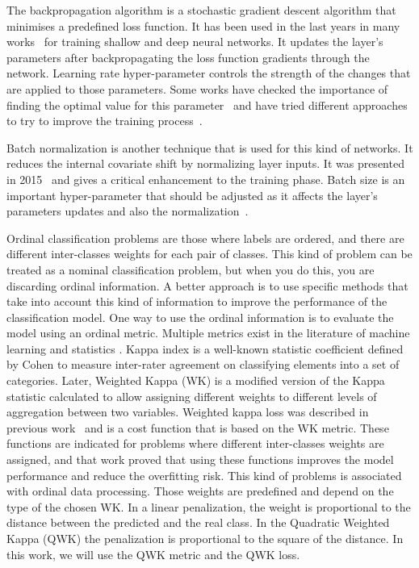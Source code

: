 \documentclass[journal]{IEEEtran}
\begin{document}
	The backpropagation algorithm is a stochastic gradient descent algorithm that minimises a predefined loss function. It has been used in the last years in many works~\cite{leonard1990improvement,yu1995dynamic,krizhevsky2012imagenet,de2018weighted} for training shallow and deep neural networks. It updates the layer's parameters after backpropagating the loss function gradients through the network. Learning rate hyper-parameter controls the strength of the changes that are applied to those parameters. Some works have checked the importance of finding the optimal value for this parameter~\cite{senior2013empirical} and have tried different approaches to try to improve the training process~\cite{smith2017cyclical}.
	
	Batch normalization is another technique that is used for this kind of networks. It reduces the internal covariate shift by normalizing layer inputs. It was presented in 2015~\cite{ioffe2015batch} and gives a critical enhancement to the training phase. Batch size is an important hyper-parameter that should be adjusted as it affects the layer's parameters updates and also the normalization~\cite{keskar2016large}\cite{radiuk2017impact}.
	
	Ordinal classification problems are those where labels are ordered, and there are different inter-classes weights for each pair of classes. This kind of problem can be treated as a nominal classification problem, but when you do this, you are discarding ordinal information. A better approach is to use specific methods that take into account this kind of information to improve the performance of the classification model. One way to use the ordinal information is to evaluate the model using an ordinal metric. Multiple metrics exist in the literature of machine learning and statistics \cite{cruz2014metrics,mehdiyev2016evaluating}. Kappa index is a well-known statistic coefficient defined by Cohen \cite{cohen1960coefficient} to measure inter-rater agreement on classifying elements into a set of categories. Later, Weighted Kappa (WK) is a modified version of the Kappa statistic calculated to allow assigning different weights to different levels of aggregation between two variables. Weighted kappa loss was described in previous work~\cite{de2018weighted} and is a cost function that is based on the WK metric. These functions are indicated for problems where different inter-classes weights are assigned, and that work proved that using these functions improves the model performance and reduce the overfitting risk. This kind of problems is associated with ordinal data processing. Those weights are predefined and depend on the type of the chosen WK. In a linear penalization, the weight is proportional to the distance between the predicted and the real class. In the Quadratic Weighted Kappa (QWK) the penalization is proportional to the square of the distance. In this work, we will use the QWK metric and the QWK loss.
	
\end{document}
